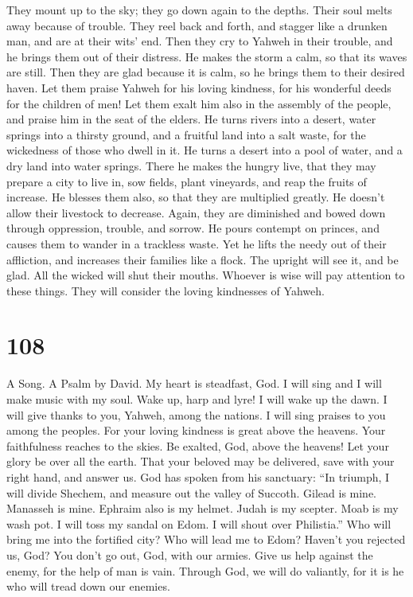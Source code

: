  They mount up to the sky; they go down again to the
depths. Their soul melts away because of trouble.  They
reel back and forth, and stagger like a drunken man, and are at their
wits' end.  Then they cry to Yahweh in their trouble, and
he brings them out of their distress.  He makes the storm
a calm, so that its waves are still.  Then they are glad
because it is calm, so he brings them to their desired haven.
 Let them praise Yahweh for his loving kindness, for his
wonderful deeds for the children of men!  Let them exalt
him also in the assembly of the people, and praise him in the seat of
the elders.  He turns rivers into a desert, water springs
into a thirsty ground,  and a fruitful land into a salt
waste, for the wickedness of those who dwell in it.  He
turns a desert into a pool of water, and a dry land into water springs.
 There he makes the hungry live, that they may prepare a
city to live in,  sow fields, plant vineyards, and reap
the fruits of increase.  He blesses them also, so that
they are multiplied greatly. He doesn't allow their livestock to
decrease.  Again, they are diminished and bowed down
through oppression, trouble, and sorrow.  He pours
contempt on princes, and causes them to wander in a trackless waste.
 Yet he lifts the needy out of their affliction, and
increases their families like a flock.  The upright will
see it, and be glad. All the wicked will shut their mouths.
 Whoever is wise will pay attention to these things. They
will consider the loving kindnesses of Yahweh.

\hypertarget{section-100}{%
\section{108}\label{section-100}}

A Song. A Psalm by David.  My heart is steadfast, God. I
will sing and I will make music with my soul.  Wake up,
harp and lyre! I will wake up the dawn.  I will give
thanks to you, Yahweh, among the nations. I will sing praises to you
among the peoples.  For your loving kindness is great
above the heavens. Your faithfulness reaches to the skies.
 Be exalted, God, above the heavens! Let your glory be
over all the earth.  That your beloved may be delivered,
save with your right hand, and answer us.  God has spoken
from his sanctuary: ``In triumph, I will divide Shechem, and measure out
the valley of Succoth.  Gilead is mine. Manasseh is mine.
Ephraim also is my helmet. Judah is my scepter.  Moab is
my wash pot. I will toss my sandal on Edom. I will shout over
Philistia.''  Who will bring me into the fortified city?
Who will lead me to Edom?  Haven't you rejected us, God?
You don't go out, God, with our armies.  Give us help
against the enemy, for the help of man is vain.  Through
God, we will do valiantly, for it is he who will tread down our enemies.

